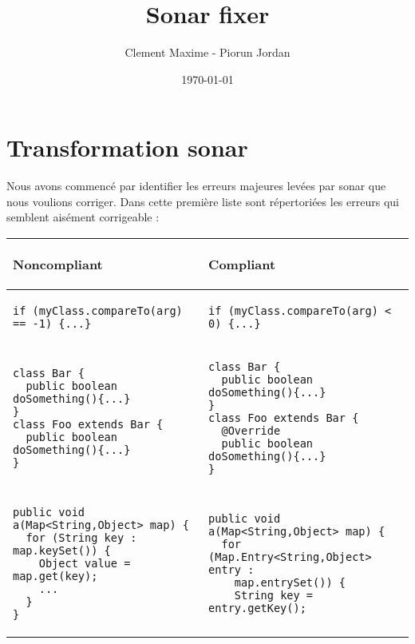 \documentclass[a4paper]{article}
\begin{document}
\title{Sonar fixer}
\author{Clement Maxime - Piorun Jordan}
\date{\today}
\maketitle
\section{Transformation sonar}
\par Nous avons commencé par identifier les erreurs majeures levées par sonar que nous voulions corriger. Dans cette première liste sont répertoriées les erreurs qui semblent aisément corrigeable :



\begin{center}
	\begin{tabular}{|p{}|p{}|}
  	\hline
	  	\begin{center}
	  	 Noncompliant
	  	 \end{center} & 
	  	 \begin{center}
	  	 Compliant
	  	 \end{center} \\
  	\hline
	\begin{lstlisting}
if (myClass.compareTo(arg) == -1) {...}
  	\end{lstlisting} 
   	& 
   	\begin{lstlisting}
if (myClass.compareTo(arg) < 0) {...}
  	\end{lstlisting}  \\
  	\hline
	\begin{lstlisting}
class Bar {
  public boolean doSomething(){...}
}
class Foo extends Bar {
  public boolean doSomething(){...}
}
  	\end{lstlisting} 
   	& 
   	\begin{lstlisting}
class Bar {
  public boolean doSomething(){...}
}
class Foo extends Bar {
  @Override
  public boolean doSomething(){...}
}
  	\end{lstlisting}  \\
  	\hline
	\begin{lstlisting}
public void a(Map<String,Object> map) {
  for (String key : map.keySet()) {  
    Object value = map.get(key);
    ...
  }
}
  	\end{lstlisting} 
   	& 
   	\begin{lstlisting}
public void a(Map<String,Object> map) {
  for (Map.Entry<String,Object> entry : 
  	map.entrySet()) {
    String key = entry.getKey();

\end{lstlisting}
\end{tabular}
\end{center}
\end{document}
